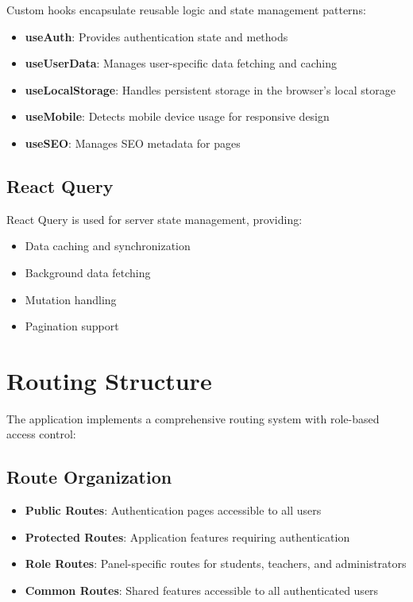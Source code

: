 Custom hooks encapsulate reusable logic and state management patterns:

\begin{itemize}
    \item \textbf{useAuth}: Provides authentication state and methods
    \item \textbf{useUserData}: Manages user-specific data fetching and caching
    \item \textbf{useLocalStorage}: Handles persistent storage in the browser's local storage
    \item \textbf{useMobile}: Detects mobile device usage for responsive design
    \item \textbf{useSEO}: Manages SEO metadata for pages
\end{itemize}

\subsection{React Query}

React Query is used for server state management, providing:

\begin{itemize}
    \item Data caching and synchronization
    \item Background data fetching
    \item Mutation handling
    \item Pagination support
\end{itemize}

\section{Routing Structure}

The application implements a comprehensive routing system with role-based access control:

\subsection{Route Organization}

\begin{itemize}
    \item \textbf{Public Routes}: Authentication pages accessible to all users
    \item \textbf{Protected Routes}: Application features requiring authentication
    \item \textbf{Role Routes}: Panel-specific routes for students, teachers, and administrators
    \item \textbf{Common Routes}: Shared features accessible to all authenticated users
\end{itemize}

